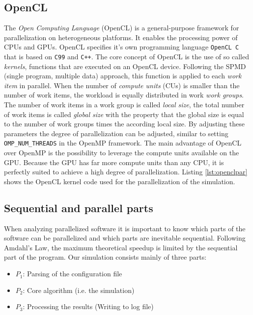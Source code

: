 \documentclass[a4paper,11pt]{scrartcl} %
\begin{document}


\subsection{OpenCL}
The \textit{Open Computing Language} (OpenCL) is a general-purpose framework for parallelization on heterogeneous platforms. It enables the processing power of CPUs and GPUs. OpenCL specifies it's own programming language \texttt{OpenCL C} that is based on \texttt{C99} and \texttt{C++}. The core concept of OpenCL is the use of so called \textit{kernels}, functions that are executed on an OpenCL device. Following the SPMD (single program, multiple data) approach, this function is applied to each \textit{work item} in parallel. When the number of \textit{compute units} (CUs) is smaller than the number of work items, the workload is equally distributed in work \textit{work groups}. The number of work items in a work group is called \textit{local size}, the total number of work items is called \textit{global size} with the property that the global size is equal to the number of work groups times the according local size. By adjusting these parameters the degree of parallelization can be adjusted, similar to setting \texttt{OMP\_NUM\_THREADS} in the OpenMP framework. The main advantage of OpenCL over OpenMP is the possibility to leverage the compute units available on the GPU. Because the GPU has far more compute units than any CPU, it is perfectly suited to achieve a high degree of parallelization. Listing \ref{lst:openclpar} shows the OpenCL kernel code used for the parallelization of the simulation.

\subsection{Sequential and parallel parts}
When analyzing parallelized software it is important to know which parts of the software can be parallelized and which parts are inevitable sequential. Following Amdahl's Law, the maximum theoretical speedup is limited by the sequential part of the program. Our simulation consists mainly of three parts:

\begin{itemize}
  \item $P_1$: Parsing of the configuration file
  \item $P_2$: Core algorithm (i.e. the simulation)
  \item $P_3$: Processing the results (Writing to log file)
\end{itemize}
\end{document}
